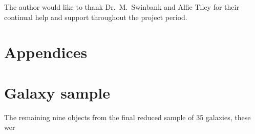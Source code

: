 \documentclass[12pt, twocolumn]{revtex4-1}    %
\begin{document}
\begin{acknowledgments}
The author would like to thank Dr.~M.~Swinbank and Alfie Tiley for their continual help and support throughout the project period.
\end{acknowledgments}




\clearpage

\appendix

\onecolumngrid
\section*{Appendices}
\section{Galaxy sample} \label{appendix:rest_of_final_sample}
\noindent
The remaining nine objects from the final reduced sample of 35 galaxies, these wer
\end{document}
